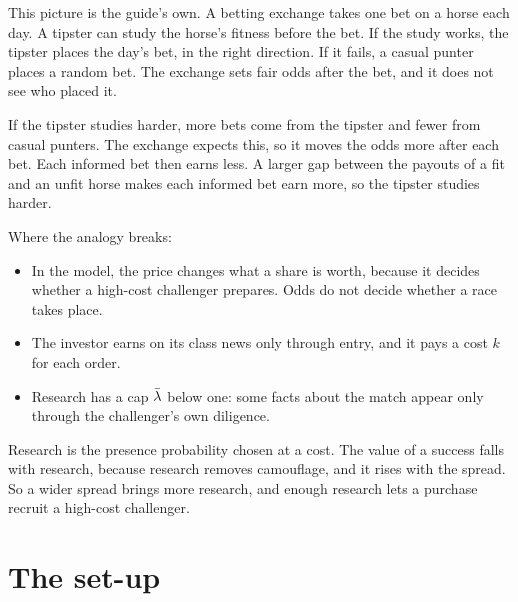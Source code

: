 \begin{analogy}
This picture is the guide's own. A betting exchange takes one bet on a horse each day. A tipster can study the
horse's fitness before the bet. If the study works, the tipster places the day's bet, in the right direction. If
it fails, a casual punter places a random bet. The exchange sets fair odds after the bet, and it does not see who
placed it.

If the tipster studies harder, more bets come from the tipster and fewer from casual punters. The exchange expects
this, so it moves the odds more after each bet. Each informed bet then earns less. A larger gap between the payouts
of a fit and an unfit horse makes each informed bet earn more, so the tipster studies harder.

Where the analogy breaks:
\begin{itemize}
\item In the model, the price changes what a share is worth, because it decides whether a high-cost challenger
prepares. Odds do not decide whether a race takes place.
\item The investor earns on its class news only through entry, and it pays a cost \(k\) for each order.
\item Research has a cap \(\bar\lambda\) below one: some facts about the match appear only through the challenger's own
diligence.
\end{itemize}
\end{analogy}

\begin{keyidea}
Research is the presence probability chosen at a cost. The value of a success falls with research, because research
removes camouflage, and it rises with the spread. So a wider spread brings more research, and enough research lets a
purchase recruit a high-cost challenger.
\end{keyidea}

\section{The set-up}\label{sec:research-setup}

